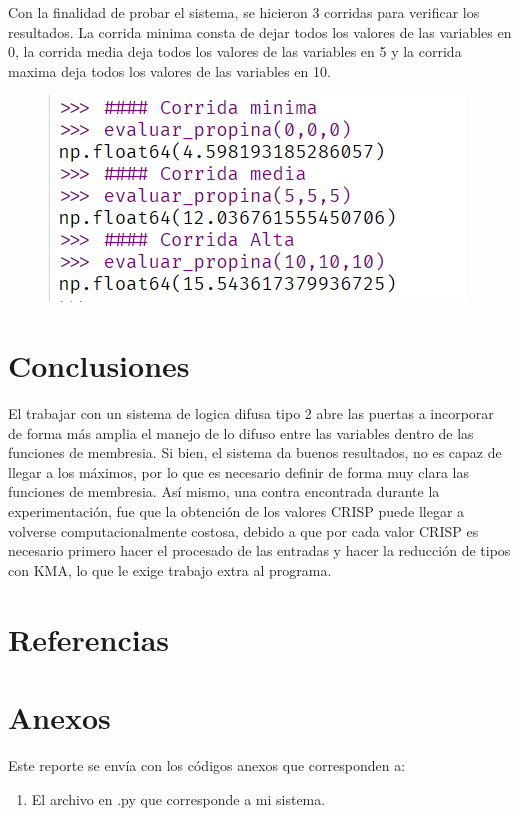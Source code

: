\documentclass[11pt, letterpaper]{article}
\begin{document}
Con la finalidad de probar el sistema, se hicieron 3 corridas para verificar los resultados.
La corrida minima consta de dejar todos los valores de las variables en 0, la corrida media deja todos los valores de las variables en 5 y la corrida maxima deja todos los valores de las variables en 10.


\begin{figure}[h]
	\centering
	\includegraphics[width=0.7\linewidth]{IMG/P17}
	\caption{}
	\label{fig:h1}
\end{figure}


\newpage

\section{Conclusiones}

El trabajar con un sistema de logica difusa tipo 2 abre las puertas a incorporar de forma más amplia el manejo de lo difuso entre las variables dentro de las funciones de membresia. Si bien, el sistema da buenos resultados, no es capaz de llegar a los máximos, por lo que es necesario definir de forma muy clara las funciones de membresia. Así mismo, una contra encontrada durante la experimentación, fue que la obtención de los valores CRISP puede llegar a volverse computacionalmente costosa, debido a que por cada valor CRISP es necesario primero hacer el procesado de las entradas y hacer la reducción de tipos con KMA, lo que le exige trabajo extra al programa.




\newpage

\section{Referencias}


\newpage

\section{Anexos}

Este reporte se envía con los códigos anexos que corresponden a:

\begin{enumerate}
	\item El archivo en .py que corresponde a mi sistema. 


\end{enumerate}
\end{document}
